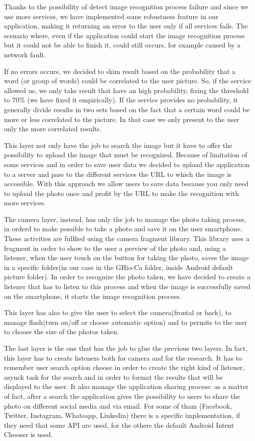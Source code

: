 Thanks to the possibility of detect image recognition process failure and since 
we use more services, we have implemented some robustness feature in our 
application, making it returning an error to the user only if all services fails. 
The scenario where, even if the application could start the image recognition 
process but it could not be able to finish it, could still occurs, for example 
caused by a network fault.

If no errors occurs, we decided to skim result based on the probability that a 
word (or group of words) could be correlated to the user picture. So, if the 
service allowed us, we only take result that have an high probability, fixing the 
threshold to 70\% (we have fixed it empirically). If the service provides no 
probability, it generally divide results in two sets based on the fact that a 
certain word could be more or less correlated to the picture. In that case we 
only present to the user only the more correlated results.

This layer not only have the job to search the image but it have to offer the 
possibility to upload the image that must be recognized. Because of limitation 
of some services and in order to save user data we decided to upload the 
application to a server and pass to the different services the URL to which the 
image is accessible. With this approach we allow users to save data because you 
only need to upload the photo once and profit by the URL to make the recognition 
with more services.

The camera layer, instead, has only the job to manage the photo taking process, in 
orderd to make possible to take a photo and save it on the user smartphone. These
activities are fullfied using the camera fragment library. This library uses a 
fragment in order to show to the user a preview of the photo and, using a 
listener, when the user touch on the button for taking the photo, saves the 
image in a specific folder(in our case in the GHio-Ca folder, inside Android 
default picture folder). In order to recognize the photo taken, we have decided 
to create a listener that has to listen to this process and when the image is 
successfully saved on the smartphone, it starts the image recognition process. 

This layer has also to give the user to select the camera(frontal or back), to 
manage flash(turn on/off or choose automatic option) and to permits to the user 
to choose the size of the photos taken.

The last layer is the one that has the job to glue the previous two layers. In 
fact, this layer has to create listeners both for camera and for the research. 
It has to remember user search option choose in order to create the right kind 
of listener, asynck task for the search and in order to format the results that 
will be displayed to the user. It also manage the application sharing process: 
as a matter of fact, after a search the application gives the possibility to 
users to share the photo on different social media and via email. For some of 
tham (Facebook, Twitter, Instagram, Whatsapp, Linkedin) there is a specific 
implementation, if they need that some API are used, for the others the default 
Android Intent Chooser is used. 